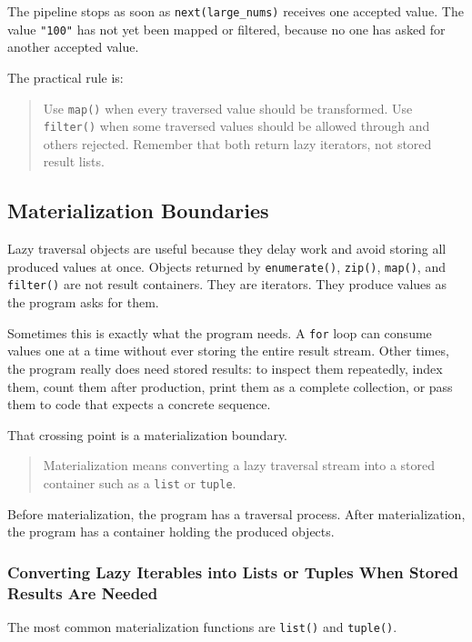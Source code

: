 \documentclass[a4paper,twoside]{report}
\begin{document}
The pipeline stops as soon as \texttt{next(large\_nums)} receives one accepted value. The value \texttt{"100"} has not yet been mapped or filtered, because no one has asked for another accepted value.

The practical rule is:

\begin{quote}
Use \texttt{map()} when every traversed value should be transformed. Use \texttt{filter()} when some traversed values should be allowed through and others rejected. Remember that both return lazy iterators, not stored result lists.
\end{quote}

\subsection{Materialization Boundaries}

Lazy traversal objects are useful because they delay work and avoid storing all produced values at once. Objects returned by \texttt{enumerate()}, \texttt{zip()}, \texttt{map()}, and \texttt{filter()} are not result containers. They are iterators. They produce values as the program asks for them.

Sometimes this is exactly what the program needs. A \texttt{for} loop can consume values one at a time without ever storing the entire result stream. Other times, the program really does need stored results: to inspect them repeatedly, index them, count them after production, print them as a complete collection, or pass them to code that expects a concrete sequence.

That crossing point is a materialization boundary.

\begin{quote}
Materialization means converting a lazy traversal stream into a stored container such as a \texttt{list} or \texttt{tuple}.
\end{quote}

Before materialization, the program has a traversal process. After materialization, the program has a container holding the produced objects.

\subsubsection{Converting Lazy Iterables into Lists or Tuples When Stored Results Are Needed}

The most common materialization functions are \texttt{list()} and \texttt{tuple()}.
\end{document}
